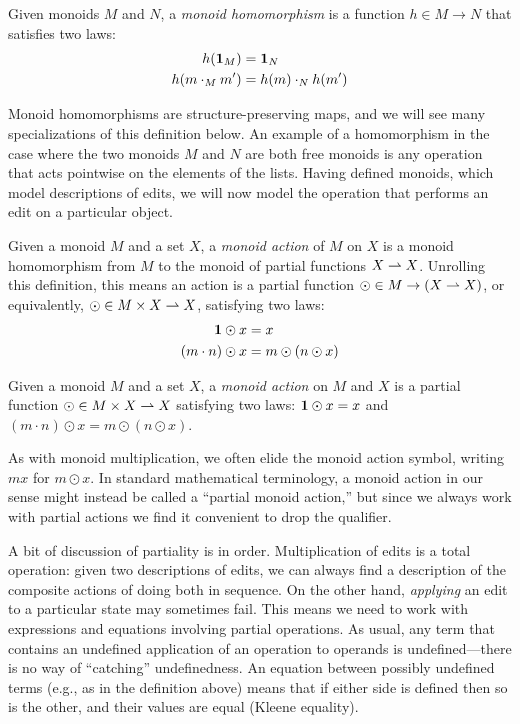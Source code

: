 \iffull
\begin{defn}
    Given monoids $M$ and $N$, a \emph{monoid homomorphism} is a function $h
    \in M \to N$ that satisfies two laws:
    \begin{align*}
        h(\mbox{\bf{1}}_M) &= \mbox{\bf{1}}_N \\
        h(m \cdot_M m') &= h(m) \cdot_N h(m')
    \end{align*}
\end{defn}
Monoid homomorphisms are structure-preserving maps, and we will see many
specializations of this definition below. An example of a homomorphism in
the case where the two monoids $M$ and $N$ are both free monoids is any
operation that acts pointwise on the elements of the lists. Having defined
monoids, which model descriptions of edits, we will now model the operation
that performs an edit on a particular object.

\begin{defn}
    Given a  monoid $M$ and a set $X$, a \emph{monoid action} of $M$ on $X$
    is a monoid homomorphism from $M$ to the monoid of partial functions $X
    \rightharpoonup X$. Unrolling this definition, this means an action is a
    partial function $\odot \in M \to (X \rightharpoonup X)$, or equivalently,
    $\odot \in M \times X \rightharpoonup X$, satisfying two laws:
    \begin{align*}
        \mbox{\bf{1}} \odot x &= x \\
        (m \cdot n) \odot x &= m \odot (n \odot x)
    \end{align*}
\end{defn}
\else

\begin{defn}
    Given a  monoid $M$ and a set $X$, a \emph{monoid action} on $M$ and $X$
    is a partial function $\odot \in M \times X \rightharpoonup X$ satisfying two laws:
\iffull
\else
$\mbox{\bf{1}} \odot x = x$ and $(m \cdot n) \odot x = m \odot (n \odot x)$.
\fi
\end{defn}
\fi
%
As with monoid multiplication, we often elide the monoid action symbol,
writing $mx$ for $m \odot x$.  In standard mathematical terminology, a
monoid action in our sense might instead be called a ``partial monoid
action,'' but since we always work with partial actions we find it
convenient to drop the qualifier.

A bit of discussion of partiality is in order.  
Multiplication of edits is a total operation: given two descriptions of
edits, we can always find a description of the composite actions of doing
both in sequence.  On the other hand, {\em applying} an edit to a particular
state may sometimes fail.
%
This means we need to work with expressions and equations involving
partial operations. As usual, any term that contains an undefined
application of an operation to operands is undefined---there is no way of
``catching'' undefinedness. An equation between possibly undefined terms 
(e.g., as in the definition above) 
means that if either side is defined then so is the other, and their values
are equal (Kleene equality).

